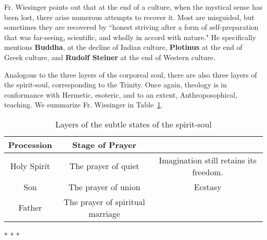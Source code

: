 Fr. Wiesinger points out that at the end of a culture, when the mystical sense has been lost, there arise numerous attempts to recover it. Most are misguided, but sometimes they are recovered by ``honest striving after a form of self-preparation that was far-seeing, scientific, and wholly in accord with nature." He specifically mentions \textbf{Buddha}, at the decline of Indian culture, \textbf{Plotinus} at the end of Greek culture, and \textbf{Rudolf Steiner} at the end of Western culture.

Analogous to the three layers of the corporeal soul, there are also three layers of the spirit-soul, corresponding to the Trinity. Once again, theology is in conformance with Hermetic, esoteric, and to an extent, Anthroposophical, teaching. We summarize Fr. Wiesinger in Table~\ref{tab:SubtleStatesWiesinger}.

\begin{table}[h]\centering\scriptsize
\begin{tabular}{ccc}\toprule
\textbf{Procession}  &
\textbf{Stage of Prayer} &
\\\midrule
Holy Spirit &
The prayer of quiet &
Imagination still retains its freedom.\\\midrule
Son &
The prayer of union &
Ecstasy\\\midrule
Father &
The prayer of spiritual marriage &
\\\bottomrule
\end{tabular}
\caption{Layers of the subtle states of the spirit-soul}
\label{tab:SubtleStatesWiesinger}
\end{table}



\begin{center}* * *\end{center}

